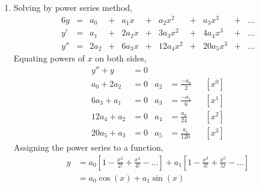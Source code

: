 \begin{enumerate}
    \item Solving by power series method,
          \begin{alignat}{6}
              y     & ={}       & a_0   & {}+{}     & a_1 x  &
              {}+{} & a_2 x^2   & {}+{} & a_3x^3    & {}+{}  & \dots \\
              y'    & ={}       & a_1   & {}+{}     & 2a_2 x &
              {}+{} & 3a_3 x^2  & {}+{} & 4a_4 x^3  & {}+{}  & \dots \\
              y''   & ={}       & 2a_2  & {}+{}     & 6a_3 x &
              {}+{} & 12a_4 x^2 & {}+{} & 20a_5 x^3 & {}+{}  & \dots
          \end{alignat}
          Equating powers of $ x $ on both sides, \\
          \begin{align}
              y'' + y     & = 0                           \\
              a_0 + 2a_2  & = 0               &
              a_2         & = \frac{-a_0}{2}  &   & [x^0] \\
              6a_3 + a_1  & = 0               &
              a_3         & = \frac{-a_1}{6}  &   & [x^1] \\
              12a_4 + a_2 & = 0               &
              a_4         & = \frac{a_0}{24}  &   & [x^2] \\
              20a_5 + a_3 & = 0               &
              a_5         & = \frac{a_1}{120} &   & [x^3]
          \end{align}
          Assigning the power series to a function,
          \begin{align}
              y & = a_0\left[ 1 - \frac{x^2}{2!} + \frac{x^4}{4!} - \dots \right]
              + a_1 \left[ 1 - \frac{x^3}{3!} + \frac{x^5}{5!} - \dots \right]    \\
                & = a_0 \cos(x) + a_1 \sin(x)
          \end{align}


\end{enumerate}
